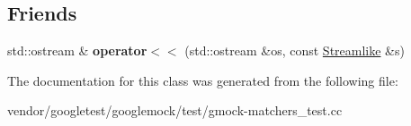 \subsection*{Friends}
\begin{DoxyCompactItemize}
\item 
\mbox{\label{classtesting_1_1gmock__matchers__test_1_1_streamlike_a4b45ba8c2a5ee61697003f02568df91f}} 
std\+::ostream \& {\bfseries operator$<$$<$} (std\+::ostream \&os, const \mbox{\hyperlink{classtesting_1_1gmock__matchers__test_1_1_streamlike}{Streamlike}} \&s)
\end{DoxyCompactItemize}


The documentation for this class was generated from the following file\+:\begin{DoxyCompactItemize}
\item 
vendor/googletest/googlemock/test/gmock-\/matchers\+\_\+test.\+cc\end{DoxyCompactItemize}
